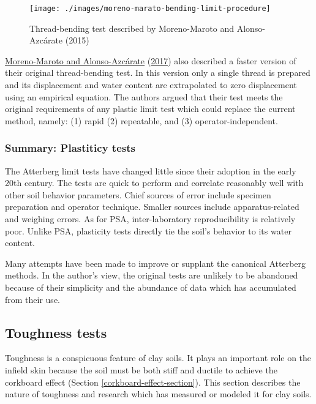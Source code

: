 \documentclass[
  letterpaper,
  openany]{book}
\begin{document}
\begin{figure}[htbp]

{\centering \texttt{[image: ./images/moreno-marato-bending-limit-procedure]} 

}

\caption[Thread-bending test (Moreno-Maroto and Alonso-Azcárate, 2015)]{Thread-bending test described by Moreno-Maroto and Alonso-Azcárate (2015)}\label{fig:moreno-marato-thread-bending-procedure}
\end{figure}

\protect\hyperlink{ref-Moreno-Maroto2017}{Moreno-Maroto and Alonso-Azcárate} (\protect\hyperlink{ref-Moreno-Maroto2017}{2017}) also described a faster version of their original thread-bending test.
In this version only a single thread is prepared and its displacement and water content are extrapolated to zero displacement using an empirical equation.
The authors argued that their test meets the original requirements of any plastic limit test which could replace the current method, namely: (1) rapid (2) repeatable, and (3) operator-independent.

\hypertarget{summary-plastiticy-tests}{%
\subsubsection{Summary: Plastiticy tests}\label{summary-plastiticy-tests}}

The Atterberg limit tests have changed little since their adoption in the early 20th century.
The tests are quick to perform and correlate reasonably well with other soil behavior parameters.
Chief sources of error include specimen preparation and operator technique.
Smaller sources include apparatus-related and weighing errors.
As for PSA, inter-laboratory reproducibility is relatively poor.
Unlike PSA, plasticity tests directly tie the soil's behavior to its water content.

Many attempts have been made to improve or supplant the canonical Atterberg methods.
In the author's view, the original tests are unlikely to be abandoned because of their simplicity and the abundance of data which has accumulated from their use.

\hypertarget{soil-toughness}{%
\subsection{Toughness tests}\label{soil-toughness}}

Toughness is a conspicuous feature of clay soils. It plays an important role on the infield skin because the soil must be both stiff and ductile to achieve the corkboard effect (Section \ref{corkboard-effect-section}).
This section describes the nature of toughness and research which has measured or modeled it for clay soils.
\end{document}
